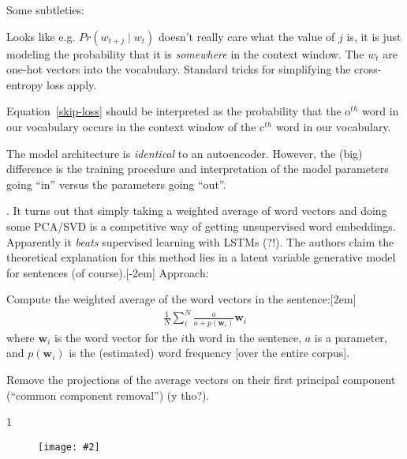 \documentclass[11pt]{article}
\renewcommand\vec[2][]{\bm{#2}_{#1}}
\newcommand\myfig[2][0.3\textwidth]{\begin{figure}[h!]\centering\texttt{[image: \#2]}\end{figure}}
\newcommand\myspace[1][]{\vspace{#1\bigskipamount}}
\newcommand\p{\Needspace{10\baselineskip} \noindent}
\begin{document}
Some subtleties:
\begin{compactitem}
	\item Looks like e.g. $Pr(w_{t + j} \mid w_t)$ doesn't really care what the value of $j$ is, it is just modeling the probability that it is \textit{somewhere} in the context window. The $w_t$ are one-hot vectors into the vocabulary. Standard tricks for simplifying the cross-entropy loss apply.
	
	\item Equation~\ref{skip-loss} should be interpreted as the probability that the o$^{th}$ word in our vocabulary occurs in the context window of the c$^{th}$ word in our vocabulary. 
	
	\item The model architecture is \textit{identical} to an autoencoder. However, the (big) difference is the training procedure and interpretation of the model parameters going ``in'' versus the parameters going ``out''.
\end{compactitem}

\myspace
\p {}. It turns out that simply taking a weighted average of word vectors and doing some PCA/SVD is a competitive way of getting unsupervised word embeddings. Apparently it \textit{beats} supervised learning with LSTMs (?!). The authors claim the theoretical explanation for this method lies in a latent variable generative model for sentences (of course).[-2em] Approach:
\begin{compactenum}
	\item Compute the weighted average of the word vectors in the sentence:[2em]
	\begin{align}
		\frac{1}{N} \sum_{i}^{N} \frac{a}{a + p(\vec[i]{w})} \vec[i]{w}
	\end{align}
	where $\vec[i]{w}$ is the word vector for the $i$th word in the sentence, $a$ is a parameter, and $p(\vec[i]{w})$ is the (estimated) word frequency [over the entire corpus]. 
	
	\item Remove the projections of the average vectors on their first principal component (``common component removal'') (y tho?).
\end{compactenum}

1\myfig[0.8\textwidth]{AroraEmbeddingAlg.png}
\end{document}
